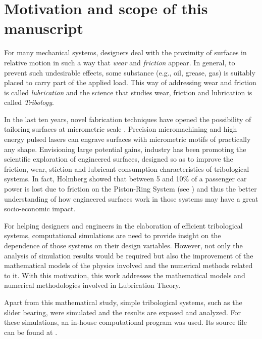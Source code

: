 \chapter{Motivation and scope of this manuscript}
\label{chap:introduction} 

For many mechanical systems, designers deal with the proximity of surfaces in relative motion in such a way that \emph{wear} and \emph{friction} appear. In general, to prevent such undesirable effects, some substance (e.g., oil, grease, gas) is suitably placed to carry part of the applied load. This way of addressing wear and friction is called \emph{lubrication} and the science that studies wear, friction and lubrication is called \emph{Tribology}.

In the last ten years, novel fabrication techniques have opened the possibility of tailoring surfaces at micrometric scale \cite{etsion05}. Precision micromachining and high energy pulsed lasers can engrave surfaces with micrometric motifs of practically any shape. Envisioning large potential gains, industry has been promoting the scientific exploration of engineered surfaces, designed so as to improve the friction, wear, stiction and lubricant consumption characteristics of tribological systems. In fact, Holmberg \cite{holm2012} showed that between 5 and 10\% of a passenger car power is lost due to friction on the Piston-Ring System (see ) and thus the better understanding of how engineered surfaces work in those systems may have a great socio-economic impact.

For helping designers and engineers in the elaboration of efficient tribological systems, computational simulations are need to provide insight on the dependence of those systems on their design variables. However, not only the analysis of simulation results would be required but also the improvement of the mathematical models of the physics involved and the numerical methods related to it. With this motivation, this work addresses the mathematical models and numerical methodologies involved in Lubrication Theory. 

Apart from this mathematical study, simple tribological systems, such as the slider bearing, were simulated and the results are exposed and analyzed. For these simulations, an in-house computational program was used. Its source file can be found at \href{http://www.lcad.icmc.usp.br/~buscaglia/download.html}{\color{black}{www.lcad.icmc.usp.br/
$\sim$buscaglia/download.html}}.

